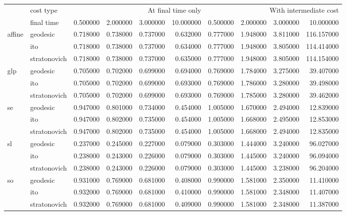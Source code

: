 \begin{tabular}{llrrrrrrrr}
\toprule
 & cost type & \multicolumn{4}{r}{At final time only} & \multicolumn{4}{r}{With intermediate cost} \\
 & final time & 0.500000 & 2.000000 & 3.000000 & 10.000000 & 0.500000 & 2.000000 & 3.000000 & 10.000000 \\
\midrule
\multirow[t]{3}{*}{affine} & geodesic & 0.718000 & 0.738000 & 0.737000 & 0.632000 & 0.777000 & 1.948000 & 3.811000 & 116.157000 \\
 & ito & 0.718000 & 0.738000 & 0.737000 & 0.634000 & 0.777000 & 1.948000 & 3.805000 & 114.414000 \\
 & stratonovich & 0.718000 & 0.738000 & 0.737000 & 0.635000 & 0.777000 & 1.948000 & 3.805000 & 114.154000 \\
\cline{1-10}
\multirow[t]{3}{*}{glp} & geodesic & 0.705000 & 0.702000 & 0.699000 & 0.694000 & 0.769000 & 1.784000 & 3.275000 & 39.407000 \\
 & ito & 0.705000 & 0.702000 & 0.699000 & 0.693000 & 0.769000 & 1.786000 & 3.280000 & 39.498000 \\
 & stratonovich & 0.705000 & 0.702000 & 0.699000 & 0.693000 & 0.769000 & 1.785000 & 3.280000 & 39.462000 \\
\cline{1-10}
\multirow[t]{3}{*}{se} & geodesic & 0.947000 & 0.801000 & 0.734000 & 0.454000 & 1.005000 & 1.670000 & 2.494000 & 12.839000 \\
 & ito & 0.947000 & 0.802000 & 0.735000 & 0.454000 & 1.005000 & 1.668000 & 2.495000 & 12.853000 \\
 & stratonovich & 0.947000 & 0.802000 & 0.735000 & 0.454000 & 1.005000 & 1.668000 & 2.494000 & 12.835000 \\
\cline{1-10}
\multirow[t]{3}{*}{sl} & geodesic & 0.237000 & 0.245000 & 0.227000 & 0.079000 & 0.303000 & 1.444000 & 3.240000 & 96.027000 \\
 & ito & 0.238000 & 0.243000 & 0.226000 & 0.079000 & 0.303000 & 1.445000 & 3.240000 & 96.094000 \\
 & stratonovich & 0.238000 & 0.243000 & 0.226000 & 0.079000 & 0.303000 & 1.445000 & 3.238000 & 96.204000 \\
\cline{1-10}
\multirow[t]{3}{*}{so} & geodesic & 0.931000 & 0.769000 & 0.681000 & 0.408000 & 0.990000 & 1.581000 & 2.350000 & 11.410000 \\
 & ito & 0.932000 & 0.769000 & 0.681000 & 0.410000 & 0.990000 & 1.581000 & 2.348000 & 11.407000 \\
 & stratonovich & 0.932000 & 0.769000 & 0.681000 & 0.409000 & 0.990000 & 1.581000 & 2.348000 & 11.387000 \\

\end{tabular}
